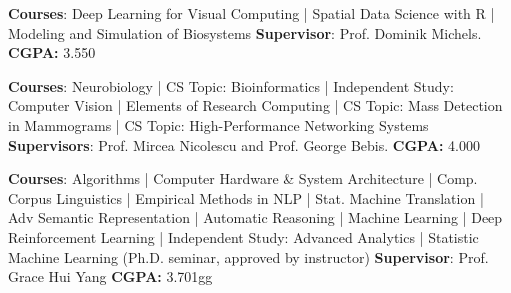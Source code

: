 \documentclass[
  a4paper, 
   maincolor=cvblue,
   sectioncolor=cvblue,
]{fortysecondscv}
\begin{document}





\newpage
\restoregeometry
{}\paperwidth
\makefrontsidebar


\begin{cvtable}
		{\textbf{Courses}: Deep Learning for Visual Computing  |  Spatial Data Science with R  |  Modeling and Simulation of Biosystems\quad
		\textbf{Supervisor}: Prof. Dominik Michels.\quad
		\textbf{CGPA: }3.550\\
		  }
  
		{\textbf{Courses}: Neurobiology  |  CS Topic: Bioinformatics  |  Independent Study: Computer Vision  |  Elements of Research Computing  |  CS Topic: Mass Detection in Mammograms  |  CS Topic: High-Performance Networking Systems\quad
		\textbf{Supervisors}: Prof. Mircea Nicolescu and Prof. George Bebis.\quad
		\textbf{CGPA: }4.000\\
		 }
		
		{\textbf{Courses}: Algorithms  |  Computer Hardware \& System Architecture  |  Comp. Corpus Linguistics  |  Empirical Methods in NLP  |  Stat. Machine Translation  |  Adv Semantic Representation  |  Automatic Reasoning  |  Machine Learning  |  Deep Reinforcement Learning  |  Independent Study: Advanced Analytics  |  Statistic Machine Learning (Ph.D. seminar, approved by instructor)\quad
		\textbf{Supervisor}: Prof. Grace Hui Yang\quad
		\textbf{CGPA: }3.701\color{white}gg\color{black}\\
	  }


\end{cvtable}
\end{document}
